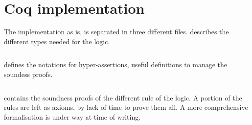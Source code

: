 \section{Coq implementation}
\label{sec:coq-code}

The implementation as is, is separated in three different files.  describes the different types needed for the logic.

\inputminted[breaklines]{Coq}{code/structures.v}

 defines the notations for hyper-assertions, useful definitions to manage the soundess proofs.

\inputminted[breaklines]{Coq}{code/notation.v}

 contains the soundness proofs of the different rule of the logic. A portion of the rules are left as axioms, by lack of time to prove them all. A more comprehensive formalisation is under way at time of writing.

\inputminted[breaklines]{Coq}{code/prelude.v}